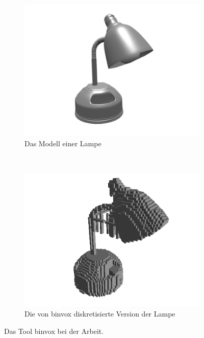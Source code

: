 \begin{figure}
	\begin{subfigure}[t]{0.5\textwidth}
		\centering
		\includegraphics[width=\textwidth]{images/lamp_obj}
		\caption{Das Modell einer Lampe}
	\end{subfigure}
	~
	\begin{subfigure}[t]{0.5\textwidth}
		\centering
		\includegraphics[width=\textwidth]{images/lamp_discrete}
		\caption{Die von binvox diskretisierte Version der Lampe}
	\end{subfigure}
	\caption{Das Tool binvox bei der Arbeit.}
\end{figure}
